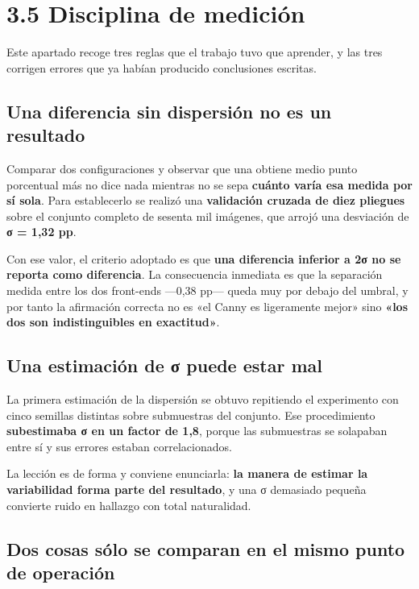 \section{3.5 Disciplina de medición}\label{disciplina-de-mediciuxf3n}

Este apartado recoge tres reglas que el trabajo tuvo que aprender, y las
tres corrigen errores que ya habían producido conclusiones escritas.

\subsection{Una diferencia sin dispersión no es un
resultado}\label{una-diferencia-sin-dispersiuxf3n-no-es-un-resultado}

Comparar dos configuraciones y observar que una obtiene medio punto
porcentual más no dice nada mientras no se sepa \textbf{cuánto varía esa
medida por sí sola}. Para establecerlo se realizó una \textbf{validación
cruzada de diez pliegues} sobre el conjunto completo de sesenta mil
imágenes, que arrojó una desviación de \textbf{σ = 1,32 pp}.

Con ese valor, el criterio adoptado es que \textbf{una diferencia
inferior a 2σ no se reporta como diferencia}. La consecuencia inmediata
es que la separación medida entre los dos front-ends ---0,38 pp--- queda
muy por debajo del umbral, y por tanto la afirmación correcta no es «el
Canny es ligeramente mejor» sino \textbf{«los dos son indistinguibles en
exactitud»}.

\subsection{Una estimación de σ puede estar
mal}\label{una-estimaciuxf3n-de-ux3c3-puede-estar-mal}

La primera estimación de la dispersión se obtuvo repitiendo el
experimento con cinco semillas distintas sobre submuestras del conjunto.
Ese procedimiento \textbf{subestimaba σ en un factor de 1,8}, porque las
submuestras se solapaban entre sí y sus errores estaban correlacionados.

La lección es de forma y conviene enunciarla: \textbf{la manera de
estimar la variabilidad forma parte del resultado}, y una σ demasiado
pequeña convierte ruido en hallazgo con total naturalidad.

\subsection{Dos cosas sólo se comparan en el mismo punto de
operación}\label{dos-cosas-suxf3lo-se-comparan-en-el-mismo-punto-de-operaciuxf3n}


